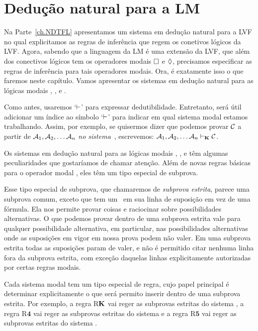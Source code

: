 \chapter{Dedução natural para a LM}
\label{Proof}

Na Parte~\ref{ch.NDTFL}  apresentamos um sistema em dedução natural para a LVF no qual explicitamos as regras de inferência que regem os conetivos lógicos da  LVF.  Agora, sabendo que a linguagem da LM é uma extensão da LVF,  que além dos conectivos lógicos tem os operadores modais   $\Box$ e $\Diamond$,  precisamos especificar as regras de inferência para tais operadores modais. Ora, é exatamente isso o que faremos neste capítulo. Vamos apresentar os sistemas em dedução  natural  para as lógicas modais  \mlK, \mlT, \mlSfour{} e \mlSfive.

Como  antes,  usaremos `$\vdash$' para expressar dedutibilidade. Entretanto, será útil adicionar um índice ao símbolo  `$\vdash$' para indicar em qual sistema modal estamos trabalhando. Assim, por exemplo, se quisermos dizer que podemos provar $\mathcal{C}$ a partir de $\mathcal{A}_1,\mathcal{A}_2, \dots \mathcal{A}_n$ \emph{no sistema}~\mlK, escrevemos: $\mathcal{A}_1,\mathcal{A}_2, \dots \mathcal{A}_n \vdash_{\mathbf{K}} \mathcal{C}$.

Os sistemas em dedução natural para as lógicas modais \mlK, \mlT, \mlSfour{} e \mlSfive{} têm algumas peculiaridades que gostaríamos de chamar atenção. Além de novas regras básicas para o operador modal \ebox{}, eles têm um tipo especial de subprova. 

 Esse  tipo especial de subprova, que chamaremos de  \emph{subprova estrita}, parece uma subprova comum, exceto que tem um~\ebox{} em sua linha de suposição em vez de uma fórmula. Ela nos permite provar coisas e raciocinar sobre possibilidades alternativas. 
 O que podemos provar dentro de uma subprova estrita vale para qualquer possibilidade alternativa, em particular, nas possibilidades alternativas onde as suposições em vigor em nossa prova podem não valer. Em uma subprova estrita todas as suposições param de valer, e não é permitido citar nenhuma linha fora da subprova estrita, com exceção daquelas linhas explicitamente autorizadas por certas regras modais.

Cada sistema modal tem um tipo especial de regra, cujo papel principal é determinar explicitamente o que será permito inserir dentro de uma subprova estrita. Por exemplo, a regra R$\mathbf{K}$ vai reger as subprovas estritas do sistema \mlK, a regra R$\mathbf{4}$ vai reger as subprovas  estritas do sistema \mlSfour{} e a regra R$\mathbf{5}$ vai reger as subprovas estritas do sistema \mlSfive{}. 

